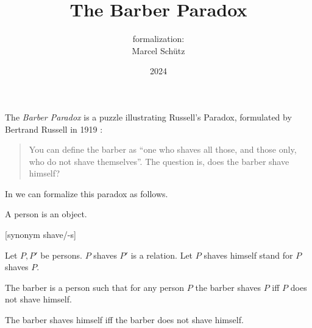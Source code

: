 \documentclass{article}
\title{The Barber Paradox}
\author{\Naproche formalization:\\[0.5em]Marcel Schütz}
\date{2024}
\begin{document}
  \maketitle

  The \emph{Barber Paradox} is a puzzle illustrating Russell's
  Paradox, formulated by Bertrand Russell in 1919 \cite[p. 355]{Russell1919}:

  \begin{quotation}
    \noindent You can define the barber as ``one who shaves all those, and 
    those only, who do not shave themselves''.
    The question is, does the barber shave himself?
  \end{quotation}
  
  \noindent In \Naproche we can formalize this paradox as follows.

  \begin{forthel}

    \begin{signature*}
      A person is an object.
    \end{signature*}
  
    [synonym shave/-s]

    \begin{signature*}
      Let $P, P'$ be persons.
      $P$ shaves $P'$ is a relation.
      Let $P$ shaves himself stand for $P$ shaves $P$.
    \end{signature*}

    \begin{signature*}
      The barber is a person such that for any person $P$ the barber shaves $P$ iff $P$ does not shave himself.
    \end{signature*}
    
    \begin{theorem*}\label{barber_paradox}
      The barber shaves himself iff the barber does not shave himself.
    \end{theorem*}
  \end{forthel}

  \printbibliography
\end{document}
